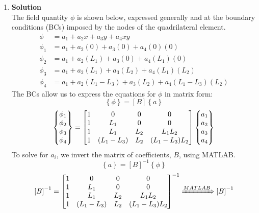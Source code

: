 \documentclass[12pt,letterpaper]{article}
\begin{document}
\begin{enumerate}[label=\arabic*.]
			\item{\textbf{Solution}}\\
				The field quantity $\phi$ is shown below, expressed generally and at the boundary conditions (BCs) imposed by the nodes of the quadrilateral element.
			\begin{align*}
				\phi &= a_1 + a_2x + a_3y + a_4xy\\
				\phi_1 &= a_1 + a_2(0) + a_3(0) + a_4(0)(0)\\
				\phi_2 &= a_1 + a_2(L_1) + a_3(0) + a_4(L_1)(0)\\
				\phi_3 &= a_1 + a_2(L_1) + a_3(L_2) + a_4(L_1)(L_2)\\
				\phi_4 &= a_1 + a_2(L_1-L_3) + a_3(L_2) + a_4(L_1-L_3)(L_2)
			\end{align*}
			The BCs allow us to express the equations for $\phi$ in matrix form:
			\begin{equation*}
				\left\{\phi\right\} = \left[B\right]\left\{a\right\}
			\end{equation*}
			\begin{equation*}
				\begin{Bmatrix}
					\phi_1 \\ \phi_2 \\ \phi_3 \\ \phi_4
				\end{Bmatrix}
				= \mqty[1 & 0 & 0 & 0 \\ 1 & L_1 & 0 & 0 \\ 1 & L_1 & L_2 & L_1L_2\\ 1 & (L_1-L_3) & L_2 & (L_1-L_3)L_2 ]
				\begin{Bmatrix}
					a_1 \\ a_2 \\ a_3 \\ a_4
				\end{Bmatrix}
			\end{equation*}
			To solve for $a_i$, we invert the matrix of coefficients, $B$, using MATLAB.
			\begin{equation*}
				\left\{a\right\} = \left[B\right]^{-1}\left\{\phi\right\}
			\end{equation*}
			\begin{equation*}
				\left[B\right]^{-1} =  \mqty[1 & 0 & 0 & 0 \\ 1 & L_1 & 0 & 0 \\ 1 & L_1 & L_2 & L_1L_2\\ 1 & (L_1-L_3) & L_2 & (L_1-L_3)L_2 ]^{-1} \xRightarrow{MATLAB} \left[B\right]^{-1}%

\end{equation*}
\end{enumerate}
\end{document}
